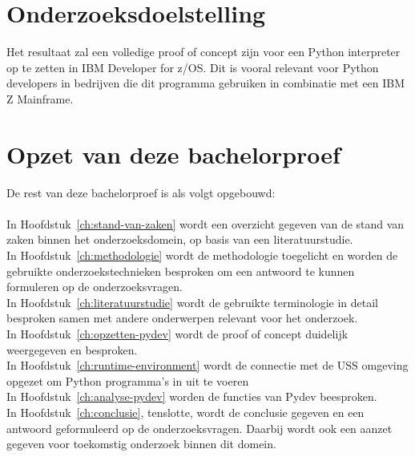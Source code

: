 \section{Onderzoeksdoelstelling}%
\label{sec:onderzoeksdoelstelling}

Het resultaat zal een volledige proof of concept zijn voor een Python interpreter op te zetten in IBM Developer for z/OS. Dit is vooral relevant voor Python developers in bedrijven die dit programma gebruiken in combinatie met een IBM Z Mainframe. 

\section{Opzet van deze bachelorproef}%
\label{sec:opzet-bachelorproef}


De rest van deze bachelorproef is als volgt opgebouwd: \\ \\

In Hoofdstuk~\ref{ch:stand-van-zaken} wordt een overzicht gegeven van de stand van zaken binnen het onderzoeksdomein, op basis van een literatuurstudie. \\

In Hoofdstuk~\ref{ch:methodologie} wordt de methodologie toegelicht en worden de gebruikte onderzoekstechnieken besproken om een antwoord te kunnen formuleren op de onderzoeksvragen. \\

In Hoofdstuk~\ref{ch:literatuurstudie} wordt de gebruikte terminologie in detail besproken samen met andere onderwerpen relevant voor het onderzoek. \\

In Hoofdstuk~\ref{ch:opzetten-pydev} wordt de proof of concept duidelijk weergegeven en besproken. \\

In Hoofdstuk~\ref{ch:runtime-environment} wordt de connectie met de USS omgeving opgezet om Python programma's in uit te voeren \\

In Hoofdstuk~\ref{ch:analyse-pydev} worden de functies van Pydev beesproken. \\

In Hoofdstuk~\ref{ch:conclusie}, tenslotte, wordt de conclusie gegeven en een antwoord geformuleerd op de onderzoeksvragen. Daarbij wordt ook een aanzet gegeven voor toekomstig onderzoek binnen dit domein. \\